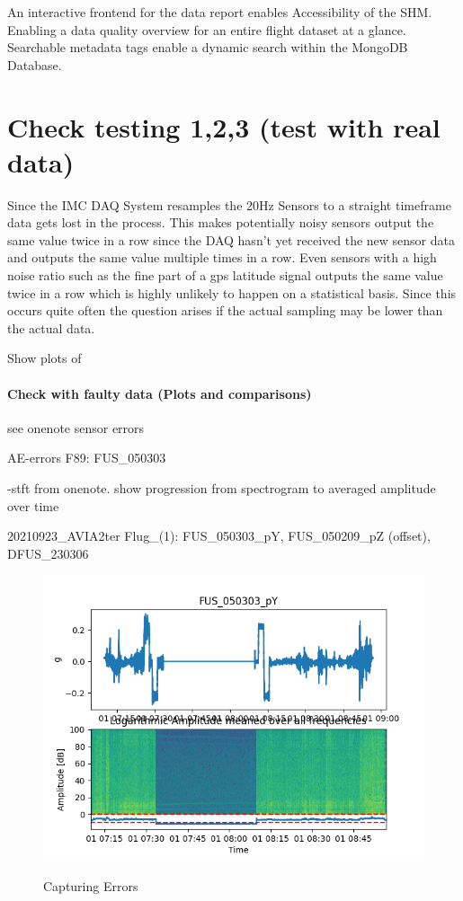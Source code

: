 An interactive frontend for the data report enables Accessibility of the SHM. Enabling a data quality overview for an entire flight dataset at a glance. Searchable metadata tags enable a dynamic search within the MongoDB Database.



\section{Check testing 1,2,3 (test with real data)}




Since the IMC DAQ System resamples the 20Hz Sensors to a straight timeframe data gets lost in the process. This makes potentially noisy sensors output the same value twice in a row since the DAQ hasn't yet received the new sensor data and outputs the same value multiple times in a row. Even sensors with a high noise ratio such as the fine part of a gps latitude signal outputs the same value twice in a row which is highly unlikely to happen on a statistical basis. Since this occurs quite often the question arises if the actual sampling may be lower than the actual data.






Show plots of
\paragraph{Check with faulty data (Plots and comparisons)}
see onenote sensor errors

AE-errors
F89: FUS_050303

-stft from onenote. show progression from spectrogram to averaged amplitude over time


20210923_AVIA2ter Flug_(1): FUS_050303_pY, FUS_050209_pZ (offset), DFUS_230306

\begin{figure}
    \centering
    \includegraphics[width=.7\textwidth]{03_figures/python_functions/images/FUS_050303_spectro.png}
    \label{fig:res_050303_spectrogram}
    \caption{Capturing Errors}
\end{figure}



